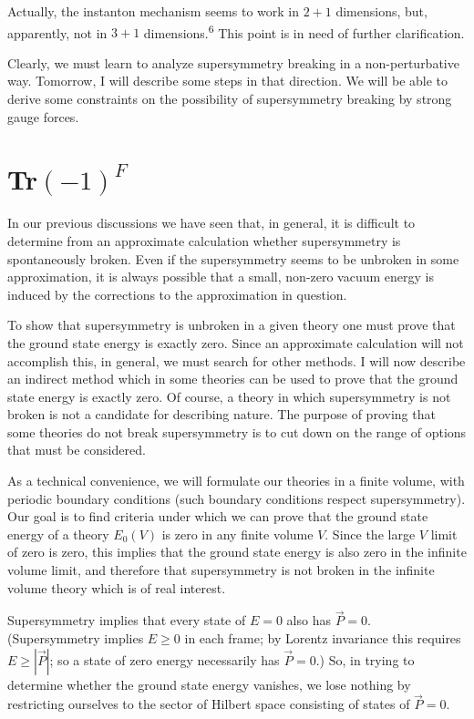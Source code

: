 Actually, the instanton mechanism seems to work in $2+1$ dimensions,
but, apparently, not in $3+1$ dimensions.\textsuperscript{6} This point is in
need of further clarification.

Clearly, we must learn to analyze supersymmetry breaking in a
non-perturbative way. Tomorrow, I will describe some steps in that
direction. We will be able to derive some constraints on the possibility
of supersymmetry breaking by strong gauge forces.

\section[Tr(-1)^F]{Tr$(-1)^F$}

In our previous discussions we have seen that, in general, it
is difficult to determine from an approximate calculation whether
supersymmetry is spontaneously broken. Even if the supersymmetry
seems to be unbroken in some approximation, it is always possible
that a small, non-zero vacuum energy is induced by the corrections
to the approximation in question.

To show that supersymmetry is unbroken in a given theory one
must prove that the ground state energy is exactly zero. Since an
approximate calculation will not accomplish this, in general, we
must search for other methods. I will now describe an indirect
method which in some theories can be used to prove that the ground
state energy is exactly zero. Of course, a theory in which supersymmetry
is not broken is not a candidate for describing nature. The
purpose of proving that some theories do not break supersymmetry is
to cut down on the range of options that must be considered.

As a technical convenience, we will formulate our theories in a
finite volume, with periodic boundary conditions (such boundary conditions
respect supersymmetry). Our goal is to find criteria under
which we can prove that the ground state energy of a theory $E_0(V)$ is
zero in any finite volume $V$. Since the large $V$ limit of zero is zero,
this implies that the ground state energy is also zero in the infinite
volume limit, and therefore that supersymmetry is not broken in the
infinite volume theory which is of real interest.

Supersymmetry implies that every state of $E = 0$ also has $\vec P = 0$.
(Supersymmetry implies $E \geq 0$ in each frame; by Lorentz invariance
this requires $E \geq |\vec P|$; so a state of zero energy necessarily has
$\vec P = 0$.) So, in trying to determine whether the ground state energy
vanishes, we lose nothing by restricting ourselves to the sector of
Hilbert space consisting of states of $\vec P = 0$.

